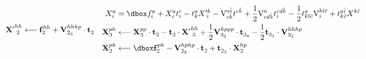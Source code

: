 \documentclass[thesis.tex]{subfiles}
\begin{document}
\begin{equation}
\begin{align}
  \bxxint{hh}{2} &\longleftarrow \bfint{hh}{2} + \bvint{hhhp}{2_{3}}\cdot\btamp{}{2}
\end{align}
\begin{align}
  \xint{a}{i} &= \dboxed{\fint{a}{i}} + \xint{a}{c}\tamp{c}{i} - \tamp{a}{k}\xxint{k}{i} - \vint{a\bar{i}}{c\bar{k}}\tamp{c\bar{k}}{} + \frac{1}{2}\vint{a}{cd\bar{k}}\tamp{cd\bar{k}}{i} - \frac{1}{2}\tamp{a}{kl\bar{c}}\vint{kl\bar{c}}{i} + \tamp{a\bar{i}}{k\bar{c}}\xint{k\bar{c}}{} \notag \\
  \bxint{ph}{3} &\longleftarrow \bxint{pp}{3}\cdot\btamp{}{3} - \btamp{}{3}\cdot\bxxint{hh}{3} + \frac{1}{2}\bvint{hppp}{3_{2}}\cdot\btamp{}{3_{4}} - \frac{1}{2}\btamp{}{3_{1}}\cdot\bvint{hhhp}{3_{3}} \notag \\
  \bxint{ph}{2} &\longleftarrow \dboxed{\bfint{ph}{2}} - \bvint{hphp}{2_{2}}\cdot\btamp{}{2} + \btamp{}{2_{3}}\cdot\bxint{hp}{2}
\end{align}



\end{equation}
\end{document}
